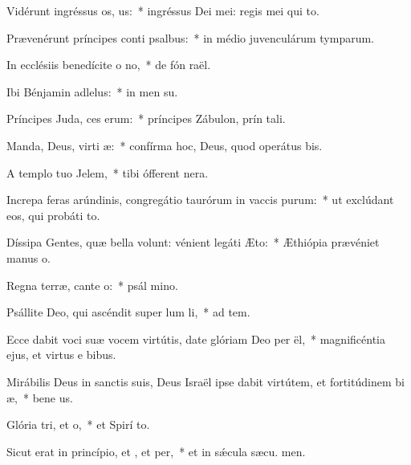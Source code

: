 \item Vidérunt ingréssus os, us:~* ingréssus Dei mei: regis mei qui   to.
\item Prævenérunt príncipes conti psalbus:~* in médio juvenculárum tymparum.
\item In ecclésiis benedícite o no,~* de fón raël.
\item Ibi Bénjamin adlelus:~* in men su.
\item Príncipes Juda, ces erum:~* príncipes Zábulon, prín tali.
\item Manda, Deus, virti æ:~* confírma hoc, Deus, quod operátus   bis.
\item A templo tuo  Jelem,~* tibi ófferent  nera.
\item Increpa feras arúndinis, congregátio taurórum in vaccis purum:~* ut exclúdant eos, qui probáti  to.
\item Díssipa Gentes, quæ bella volunt: vénient legáti  Æto:~* Æthiópia prævéniet manus  o.
\item Regna terræ, cante o:~* psál mino.
\item Psállite Deo, qui ascéndit super lum li,~* ad tem.
\item Ecce dabit voci suæ vocem virtútis, date glóriam Deo per ël,~* magnificéntia ejus, et virtus e  bibus.
\item Mirábilis Deus in sanctis suis, Deus Israël ipse dabit virtútem, et fortitúdinem bi æ,~* bene us.
\item Glória tri, et o,~* et Spirí to.
\item Sicut erat in princípio, et , et per,~* et in sǽcula sæcu. men.
